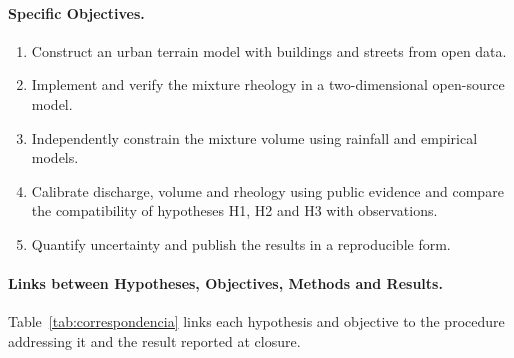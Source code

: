 \paragraph{Specific Objectives.}
\begin{enumerate}
\item Construct an urban terrain model with buildings and streets from open data.
\item Implement and verify the mixture rheology in a two-dimensional open-source model.
\item Independently constrain the mixture volume using rainfall and empirical models.
\item Calibrate discharge, volume and rheology using public evidence and compare the compatibility of hypotheses H1, H2 and H3 with observations.
\item Quantify uncertainty and publish the results in a reproducible form.
\end{enumerate}

\paragraph{Links between Hypotheses, Objectives, Methods and Results.} Table~\ref{tab:correspondencia} links each hypothesis and objective to the procedure addressing it and the result reported at closure.

